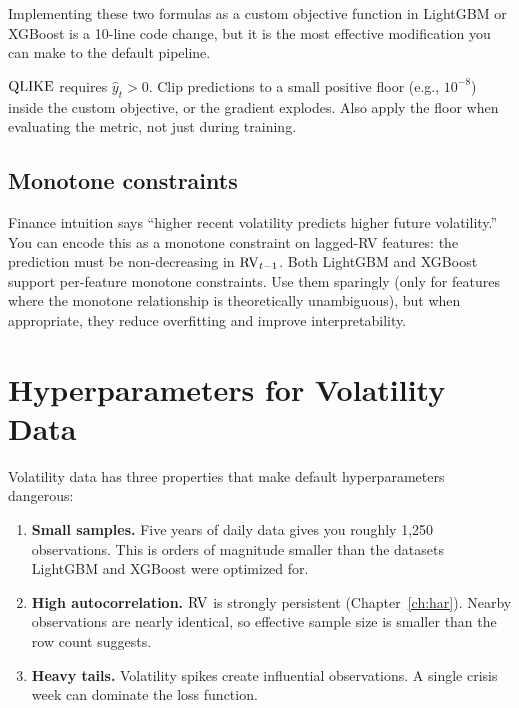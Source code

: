 \begin{projectconnection}
Implementing these two formulas as a custom objective function in LightGBM
or XGBoost is a 10-line code change, but it is the most effective
modification you can make to the default pipeline.
\end{projectconnection}

\begin{warning}
$\operatorname{QLIKE}$ requires $\hat{y}_t > 0$.  Clip predictions to a small positive
floor (e.g., $10^{-8}$) inside the custom objective, or the gradient
explodes.  Also apply the floor when evaluating the metric, not just during
training.
\end{warning}

\subsection*{Monotone constraints}

Finance intuition says ``higher recent volatility predicts higher future
volatility.''  You can encode this as a monotone constraint on lagged-RV
features: the prediction must be non-decreasing in $\operatorname{RV}_{t-1}$.  Both
LightGBM and XGBoost support per-feature monotone constraints.  Use them
sparingly (only for features where the monotone relationship is
theoretically unambiguous), but when appropriate, they reduce overfitting
and improve interpretability.


\section{Hyperparameters for Volatility Data}\label{sec:trees:hyperparams}

Volatility
data has three properties that make default hyperparameters dangerous:

\begin{enumerate}[leftmargin=1.8em]
\item \textbf{Small samples.}
  Five years of daily data gives you roughly 1,250 observations.  This is
  orders of magnitude smaller than the datasets LightGBM and XGBoost were
  optimized for.

\item \textbf{High autocorrelation.}
  $\operatorname{RV}$ is strongly persistent (Chapter~\ref{ch:har}).  Nearby observations
  are nearly identical, so effective sample size is smaller than the row
  count suggests.

\item \textbf{Heavy tails.}
  Volatility spikes create influential observations.  A single crisis week
  can dominate the loss function.
\end{enumerate}

